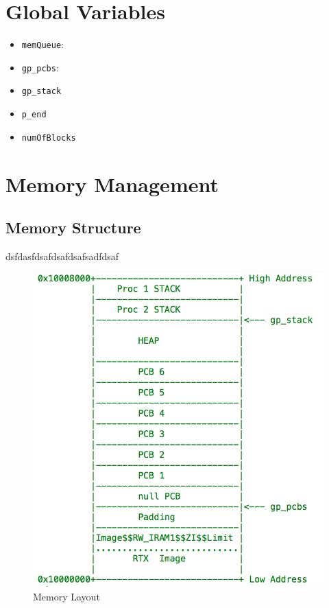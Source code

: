 \documentclass[12pt]{report}
\begin{document}
\section{Global Variables}
\begin{itemize}
  \item \texttt{memQueue}:
  \item \texttt{gp_pcbs}:
  \item \texttt{gp_stack}
  \item \texttt{p_end}
  \item \texttt{numOfBlocks}
\end{itemize}

\section{Memory Management}

\subsection{Memory Structure}

dsfdasfdsafdsafdsafsadfdsaf

\begin{figure}
	\includegraphics{memory.png}
\caption{Memory Layout}

\end{figure}
\end{document}
